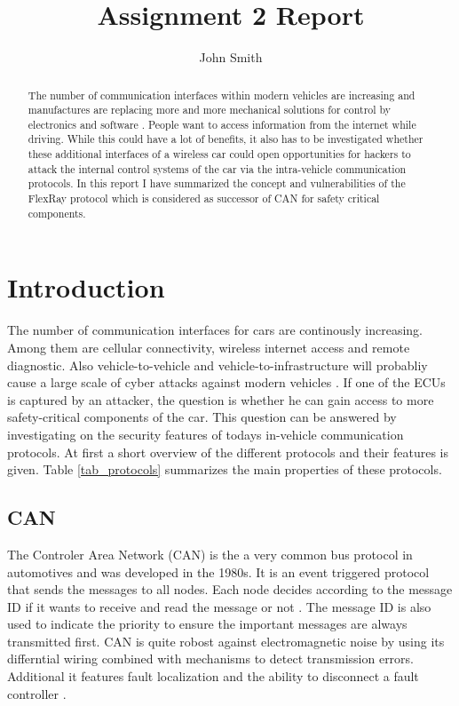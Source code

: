 \documentclass{latex4ei/latex4ei_report}		%
\title{Assignment 2 Report}
\author{John Smith}
\begin{document}
\maketitle

\begin{abstract}
    The number of communication interfaces within modern vehicles are increasing and manufactures are replacing more and more mechanical solutions for control by electronics and software \cite{alarm}.
    People want to access information from the internet while driving. While this could have a lot of benefits, it also has to be investigated whether these additional interfaces of a wireless car could open opportunities for hackers to attack the internal control systems of the car via the intra-vehicle communication protocols.
    In this report I have summarized the concept and vulnerabilities of the FlexRay protocol which is considered as successor of CAN for safety critical components. 
\end{abstract}
\vspace{1cm}


\section{Introduction}

The number of communication interfaces for cars are continously increasing. Among them are cellular connectivity, wireless internet access and remote diagnostic. Also vehicle-to-vehicle and vehicle-to-infrastructure will probabliy cause a large scale of cyber attacks against modern vehicles \cite{safe}. If one of the ECUs is captured by an attacker, the question is whether he can gain access to more safety-critical components of the car. This question can be answered by investigating on the security features of todays in-vehicle communication protocols.
At first a short overview of the different protocols and their features is given. Table \ref{tab_protocols} summarizes the main properties of these protocols.

    \subsection{CAN}
    The Controler Area Network (CAN) is the a very common bus protocol in automotives and was developed in the 1980s. It is an event triggered protocol that sends the messages to all nodes. Each node decides according to the message ID if it wants to receive and read the message or not . The message ID is also used to indicate the priority to ensure the important messages are always transmitted first. CAN is quite robost against electromagnetic noise by using its differntial wiring combined with mechanisms to detect transmission errors. Additional it features fault localization and the ability to disconnect a fault controller \cite{wolf}.
\end{document}
